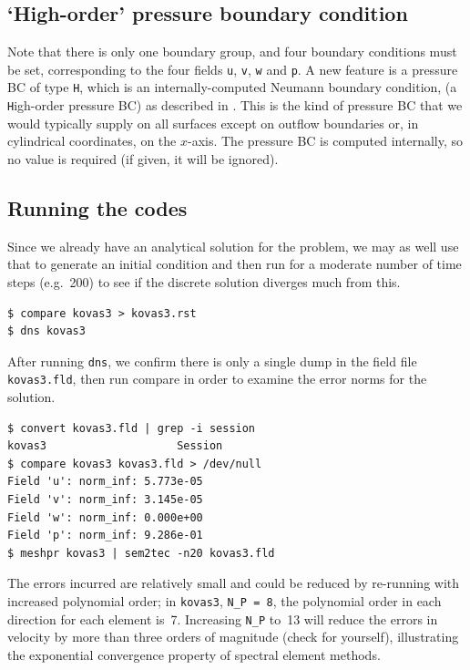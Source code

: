 \documentclass[11pt]{report}
\newcommand{\eg}{e.g.\ } \newcommand{\CC}{\mathrm{c.c.}}
\begin{document}
\subsection{`High-order' pressure boundary condition}

Note that there is only one boundary group, and four boundary
conditions must be set, corresponding to the four fields \verb+u+,
\verb+v+, \verb+w+ and \verb+p+.  A new feature is a pressure BC of
type \verb+H+, which is an internally-computed Neumann boundary
condition, (a \verb+H+igh-order pressure BC) as described in
\citet{kio91}.  This is the kind of pressure BC that we would
typically supply on all surfaces except on outflow boundaries or, in
cylindrical coordinates, on the $x$-axis.  The pressure BC is computed
internally, so no value is required (if given, it will be ignored).

\subsection{Running the codes}

Since we already have an analytical solution for the problem, we may
as well use that to generate an initial condition and then run for a
moderate number of time steps (\eg 200) to see if the discrete
solution diverges much from this.
{\small
\begin{verbatim}
$ compare kovas3 > kovas3.rst
$ dns kovas3
\end{verbatim}
}

After running \verb+dns+, we confirm there is only a single dump in the
field file \verb+kovas3.fld+, then run compare in order to examine the
error norms for the solution.
%
{\small
\begin{verbatim}
$ convert kovas3.fld | grep -i session
kovas3                    Session
$ compare kovas3 kovas3.fld > /dev/null
Field 'u': norm_inf: 5.773e-05
Field 'v': norm_inf: 3.145e-05
Field 'w': norm_inf: 0.000e+00
Field 'p': norm_inf: 9.286e-01
$ meshpr kovas3 | sem2tec -n20 kovas3.fld
\end{verbatim}
}
%
The errors incurred are relatively small and could be reduced by
re-running with increased polynomial order; in \verb|kovas3|,
\verb|N_P = 8|, \ie the polynomial order in each direction for each
element is~7.  Increasing \verb|N_P| to~13 will reduce the errors in
velocity by more than three orders of magnitude (check for yourself),
illustrating the exponential convergence property of spectral element
methods.
\end{document}
